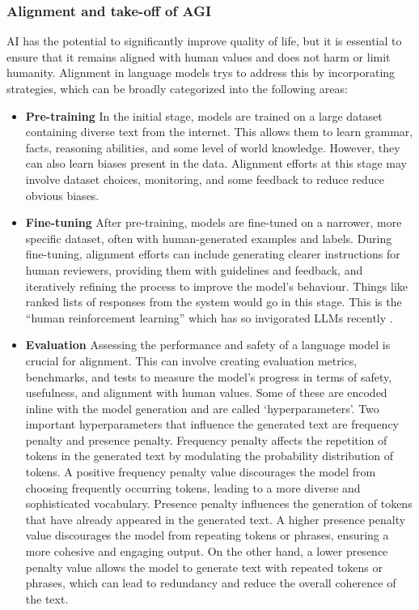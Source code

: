 \subsubsection{Alignment and take-off of AGI}
AI has the potential to significantly improve quality of life, but it is essential to ensure that it remains aligned with human values and does not harm or limit humanity. Alignment in language models trys to address this by incorporating strategies, which can be broadly categorized into the following areas:
\begin{itemize}
\item \textbf{Pre-training} In the initial stage, models are trained on a large dataset containing diverse text from the internet. This allows them to learn grammar, facts, reasoning abilities, and some level of world knowledge. However, they can also learn biases present in the data. Alignment efforts at this stage may involve dataset choices, monitoring, and some feedback to reduce reduce obvious biases.
\item \textbf{Fine-tuning} After pre-training, models are fine-tuned on a narrower, more specific dataset, often with human-generated examples and labels. During fine-tuning, alignment efforts can include generating clearer instructions for human reviewers, providing them with guidelines and feedback, and iteratively refining the process to improve the model's behaviour. Things like ranked lists of responses from the system would go in this stage. This is the ``human reinforcement learning'' which has so invigorated LLMs recently \cite{perez2022discovering}.
\item \textbf{Evaluation} Assessing the performance and safety of a language model is crucial for alignment. This can involve creating evaluation metrics, benchmarks, and tests to measure the model's progress in terms of safety, usefulness, and alignment with human values. Some of these are encoded inline with the model generation and are called `hyperparameters'. Two important hyperparameters that influence the generated text are frequency penalty and presence penalty. Frequency penalty affects the repetition of tokens in the generated text by modulating the probability distribution of tokens. A positive frequency penalty value discourages the model from choosing frequently occurring tokens, leading to a more diverse and sophisticated vocabulary. Presence penalty influences the generation of tokens that have already appeared in the generated text. A higher presence penalty value discourages the model from repeating tokens or phrases, ensuring a more cohesive and engaging output. On the other hand, a lower presence penalty value allows the model to generate text with repeated tokens or phrases, which can lead to redundancy and reduce the overall coherence of the text.\par 

\end{itemize}
